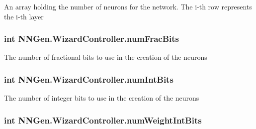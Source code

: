 An array holding the number of neurons for the network. The i-\/th row represents the i-\/th layer 

\hypertarget{class_n_n_gen_1_1_wizard_controller_a49f443f5a43ad1afbbf72a4176e1dcd6}{}
\subsubsection[{num\+Frac\+Bits}]{\setlength{\rightskip}{0pt plus 5cm}int N\+N\+Gen.\+Wizard\+Controller.\+num\+Frac\+Bits\hspace{0.3cm}{\ttfamily [get]}}\label{class_n_n_gen_1_1_wizard_controller_a49f443f5a43ad1afbbf72a4176e1dcd6}


The number of fractional bits to use in the creation of the neurons 

\hypertarget{class_n_n_gen_1_1_wizard_controller_a5216441fbf991464e4db1b1cc1d54c2d}{}
\subsubsection[{num\+Int\+Bits}]{\setlength{\rightskip}{0pt plus 5cm}int N\+N\+Gen.\+Wizard\+Controller.\+num\+Int\+Bits\hspace{0.3cm}{\ttfamily [get]}}\label{class_n_n_gen_1_1_wizard_controller_a5216441fbf991464e4db1b1cc1d54c2d}


The number of integer bits to use in the creation of the neurons 

\hypertarget{class_n_n_gen_1_1_wizard_controller_a8aafaab7cca2632ebd09f0fba6a2f09a}{}
\subsubsection[{num\+Weight\+Int\+Bits}]{\setlength{\rightskip}{0pt plus 5cm}int N\+N\+Gen.\+Wizard\+Controller.\+num\+Weight\+Int\+Bits\hspace{0.3cm}{\ttfamily [get]}}\label{class_n_n_gen_1_1_wizard_controller_a8aafaab7cca2632ebd09f0fba6a2f09a}


